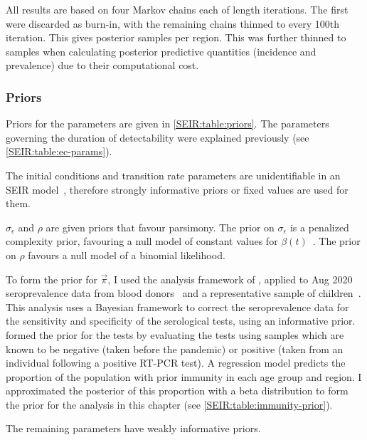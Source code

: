 \documentclass[thesis.tex]{subfiles}
\begin{document}
All results are based on four Markov chains each of length  iterations.
The first  were discarded as burn-in, with the remaining chains thinned to every 100th iteration.
This gives  posterior samples per region.
This was further thinned to  samples when calculating posterior predictive quantities (incidence and prevalence) due to their computational cost.

\subsubsection{Priors} \label{SEIR:sec:priors}

Priors for the parameters are given in \cref{SEIR:table:priors}.
The parameters governing the duration of detectability were explained previously (see \cref{SEIR:table:ec-params}).

The initial conditions and transition rate parameters are unidentifiable in an SEIR model~\autocite{dankwaStructural}, therefore strongly informative priors or fixed values are used for them.

$\sigma_\epsilon$ and $\rho$ are given priors that favour parsimony.
The prior on $\sigma_\epsilon$ is a penalized complexity prior, favouring a null model of constant values for $\beta(t)$~\autocite{simpsonPenalising}.
The prior on $\rho$ favours a null model of a binomial likelihood.

To form the prior for $\vec{\pi}$, I used the analysis framework of \textcite{amirthalingamSeroprevalence}, applied to Aug 2020 seroprevalence data from blood donors~\autocite{amirthalingamSeroprevalence} and a representative sample of children~\autocite{ratcliffeCommunity}.
This analysis uses a Bayesian framework to correct the seroprevalence data for the sensitivity and specificity of the serological tests, using an informative prior.
\Textcite{amirthalingamSeroprevalence} formed the prior for the tests by evaluating the tests using samples which are known to be negative (taken before the pandemic) or positive (taken from an individual following a positive RT-PCR test).
A regression model predicts the proportion of the population with prior immunity in each age group and region.
I approximated the posterior of this proportion with a beta distribution to form the prior for the analysis in this chapter (see \cref{SEIR:table:immunity-prior}).

The remaining parameters have weakly informative priors.
\end{document}
